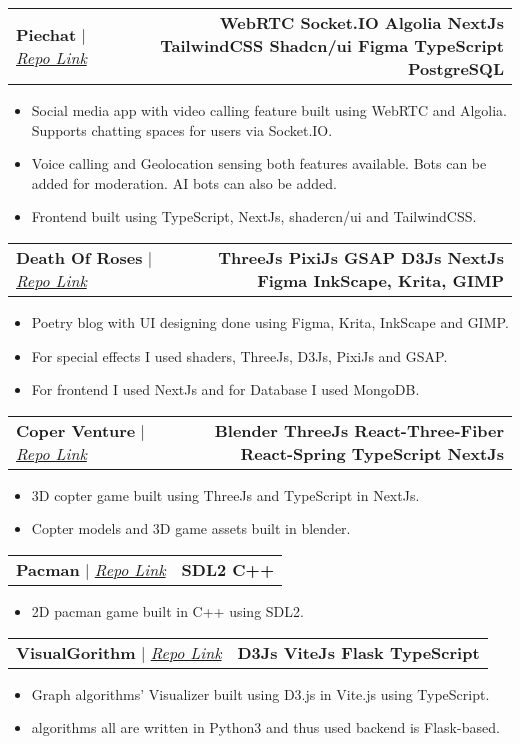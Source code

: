 \documentclass[letterpaper,11pt]{article}
\makeatletter
\newcommand{\resumeItem}[1]{
  \item\small{
    {#1 \vspace{-2pt}}
  }
}
\newcommand{\resumeProjectHeading}[2]{
    \item
    \begin{tabular*}{1.001\textwidth}{l@{\extracolsep{\fill}}r}
      \small#1 & \textbf{\small #2}\\
    \end{tabular*}\vspace{-7pt}
}
\newcommand{\resumeItemListStart}{\begin{itemize}}
\newcommand{\resumeItemListEnd}{\end{itemize}\vspace{-5pt}}
\makeatother
\begin{document}
          \resumeProjectHeading
          {\textbf{Piechat} $|$ \emph{\href{https://github.com/prabh1234assla/discord-clone}{Repo Link}}}{WebRTC Socket.IO Algolia NextJs TailwindCSS Shadcn/ui Figma TypeScript PostgreSQL}
          \resumeItemListStart
          \vspace{5pt}
            \resumeItem{Social media app with video calling feature built using WebRTC and Algolia. Supports chatting spaces for users via Socket.IO.}
            \resumeItem{Voice calling and Geolocation sensing both features available. Bots can be added for moderation. AI bots can also be added. }
            \resumeItem{Frontend built using TypeScript, NextJs, shadercn/ui and TailwindCSS. }
          \resumeItemListEnd
          \vspace{-20pt}
          
    \resumeProjectHeading
          {\textbf{Death Of Roses} $|$ \emph{\href{https://github.com/prabh1234assla/death_of_roses_nextjs_blog}{Repo Link}}}{ThreeJs PixiJs GSAP D3Js NextJs Figma InkScape, Krita, GIMP}
          \resumeItemListStart
          \vspace{5pt}
            \resumeItem{Poetry blog with UI designing done using Figma, Krita, InkScape and GIMP. }
            \resumeItem{For special effects I used shaders, ThreeJs, D3Js, PixiJs and GSAP. }
             \resumeItem{For frontend I used NextJs and for Database I used MongoDB. }
          \resumeItemListEnd
          \vspace{-20pt}

\resumeProjectHeading
{\textbf{Coper Venture} $|$ \emph{\href{ttps://github.com/prabh1234assla/coper-venture}{Repo Link}}}{Blender ThreeJs React-Three-Fiber React-Spring TypeScript NextJs}
\resumeItemListStart
\vspace{5pt}
  \resumeItem{3D copter game built using ThreeJs and TypeScript in NextJs. }
  \resumeItem{Copter models and 3D game assets built in blender. }
\resumeItemListEnd
\vspace{-20pt}

\resumeProjectHeading
{\textbf{Pacman} $|$ \emph{\href{https://github.com/prabh1234assla/Pacman}{Repo Link}}}{SDL2 C++}
\resumeItemListStart
\vspace{5pt}
  \resumeItem{2D pacman game built in C++ using SDL2. }
\resumeItemListEnd
\vspace{-20pt}

\resumeProjectHeading
{\textbf{VisualGorithm} $|$ \emph{\href{https://github.com/prabh1234assla/visualizer_algos}{Repo Link}}}{D3Js ViteJs Flask TypeScript}
\resumeItemListStart
\vspace{5pt}
  \resumeItem{Graph algorithms' Visualizer built using D3.js in Vite.js using TypeScript. }
  \resumeItem{algorithms all are written in Python3 and thus used backend is Flask-based. }
\resumeItemListEnd
\vspace{-20pt}
\end{document}

